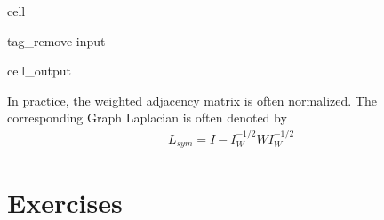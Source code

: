 \documentclass[letterpaper,10pt,english]{jupyterBook}
\begin{document}
\begin{sphinxuseclass}{cell}
\begin{sphinxuseclass}{tag_remove-input}\begin{sphinxVerbatimOutput}

\begin{sphinxuseclass}{cell_output}
\noindent{}

\end{sphinxuseclass}\end{sphinxVerbatimOutput}

\end{sphinxuseclass}
\end{sphinxuseclass}
\sphinxAtStartPar
In practice, the weighted adjacency matrix is often normalized. The corresponding Graph Laplacian is often denoted by
\begin{equation*}
\begin{split} L_{sym}= I-I_W^{-1/2}WI_W^{-1/2}\end{split}
\end{equation*}

\sphinxstepscope


\section{Exercises}
\label{\detokenize{clustering_exercises:exercises}}\label{\detokenize{clustering_exercises::doc}}
\end{document}
